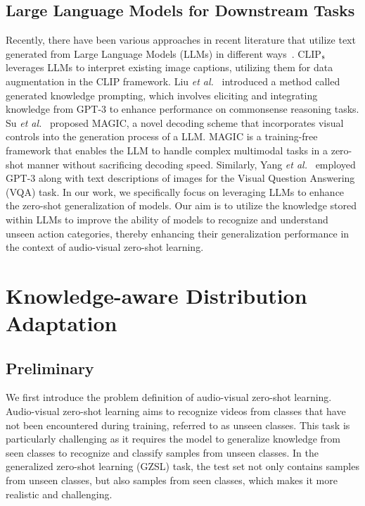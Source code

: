 \documentclass[10pt,twocolumn,letterpaper]{article}
\begin{document}
\subsection{Large Language Models for Downstream Tasks}
Recently, there have been various approaches in recent literature that utilize text generated from Large Language Models (LLMs) in different ways~\cite{santurkar2022caption,KP4cr,hu2022knowledgeable,yu2022multimodal,su2022language,yang2022empirical}. CLIP$_{\rm s}$~\cite{santurkar2022caption} leverages LLMs to interpret existing image captions, utilizing them for data augmentation in the CLIP framework. Liu \textit{et al.}~\cite{KP4cr} introduced a method called generated knowledge prompting, which involves eliciting and integrating knowledge from GPT-3 to enhance performance on commonsense reasoning tasks.
Su \textit{et al.}~\cite{su2022language} proposed MAGIC, a novel decoding scheme that incorporates visual controls into the generation process of a LLM. MAGIC is a training-free framework that enables the LLM to handle complex multimodal tasks in a zero-shot manner without sacrificing decoding speed. Similarly, Yang \textit{et al.}~\cite{yang2022empirical} employed GPT-3 along with text descriptions of images for the Visual Question Answering (VQA) task.
In our work, we specifically focus on leveraging LLMs to enhance the zero-shot generalization of models. Our aim is to utilize the knowledge stored within LLMs to improve the ability of models to recognize and understand unseen action categories, thereby enhancing their generalization performance in the context of audio-visual zero-shot learning.

\section{Knowledge-aware Distribution Adaptation}
\subsection{Preliminary}
We first introduce the problem definition of audio-visual zero-shot learning.
Audio-visual zero-shot learning aims to recognize videos from classes that have not been encountered during training, referred to as unseen classes. This task is particularly challenging as it requires the model to generalize knowledge from seen classes to recognize and classify samples from unseen classes.
In the generalized zero-shot learning (GZSL) task, the test set not only contains samples from unseen classes, but also samples from seen classes, which makes it more realistic and challenging. 
\end{document}
